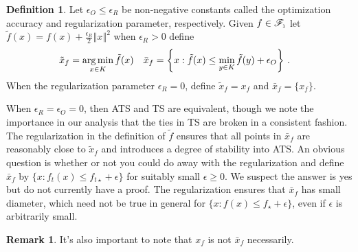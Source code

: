 \documentclass[letter, 12pt]{report}
\newcommand{\epsR}{{\epsilon_R}}
\newcommand{\epsO}{{\epsilon_O}}
\newcommand{\pl}{\text{\tiny\texttt{l}}}
\newcommand{\argmin}{\operatornamewithlimits{arg\,min}}
\newcommand{\norm}[1]{\left \Vert  #1 \right \Vert}
\newcommand{\sF}{\mathscr F}
\newcommand{\1}{\mathbf{1}}
\newcommand{\ts}{\textsc{TS}\xspace}
\newcommand{\ats}{\textsc{ATS}}
\theoremstyle{plain}
\theoremstyle{definition}
\newtheorem{definition}[theorem]{Definition}
\newtheorem{remark}[theorem]{Remark}
\theoremstyle{remark}
\begin{document}
\begin{definition}\label{def:opt}
    Let $\epsO \leq \epsR$ be non-negative constants called the optimization accuracy and regularization parameter, respectively.
    Given $f \in \sF_{\pl}$ let $\tilde f(x) = f(x) + \frac{\epsR}{2} \norm{x}^2$ when $\epsR > 0$ define
    \begin{align*}
        \tilde x_f & = \argmin_{x \in K} \tilde f(x)                                              &
        \bar x_f   & = \left\{x : \tilde f(x) \leq \min_{y \in K} \tilde f(y) + \epsO\right\} \,.
    \end{align*}
    When the regularization parameter $\epsR = 0$, define
    $\tilde x_f = x_f$
    and $\bar x_f = \{x_f\}$.
\end{definition}

When $\epsR = \epsO = 0$, then \ats{} and \ts{} are equivalent, though we note the importance in our analysis
that the ties in \ts{} are broken in a consistent fashion.
The regularization in the definition of $\tilde f$ ensures that all points in $\bar x_f$ are reasonably close to $\tilde x_f$ and introduces
a degree of stability into \ats{}.
An obvious question is whether or not you could do away with the regularization and define $\bar x_f$ by  $\{x : f_t(x) \leq f_{t\star} + \epsilon\}$
for suitably small $\epsilon \geq 0$.
We suspect the answer is yes but do not currently have a proof.
The regularization ensures that $\bar x_f$ has small diameter, which need not be true in general for $\{x : f(x) \leq f_\star + \epsilon\}$,
even if $\epsilon$ is arbitrarily small.
\begin{remark}
    It's also important to note that $x_f$ is not $\bar{x}_f$ necessarily.
\end{remark}
\end{document}
